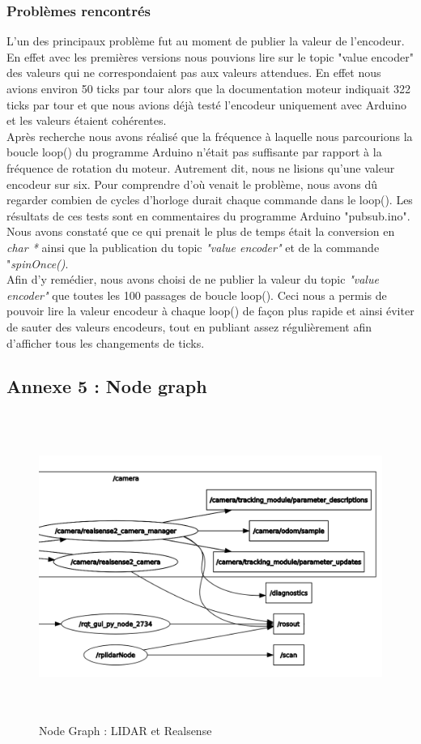 \documentclass[french]{rapportENSTAB}
\begin{document}
\subsubsection{Problèmes rencontrés}

L'un des principaux problème fut au moment de publier la valeur de l'encodeur. En effet avec les premières versions nous pouvions lire sur le topic "value encoder" des valeurs qui ne correspondaient pas aux valeurs attendues. En effet nous avions environ 50 ticks par tour alors que la documentation moteur indiquait 322 ticks par tour et que nous avions déjà testé l'encodeur uniquement avec Arduino et les valeurs étaient cohérentes.\\ 

Après recherche nous avons réalisé que la fréquence à laquelle nous parcourions la boucle loop() du programme Arduino n'était pas suffisante par rapport à la fréquence de rotation du moteur. Autrement dit, nous ne lisions qu'une valeur encodeur sur six. Pour comprendre d'où venait le problème, nous avons dû regarder combien de cycles d'horloge durait chaque commande dans le loop(). Les résultats de ces tests sont en commentaires du programme Arduino "pubsub.ino". Nous avons constaté que ce qui prenait le plus de temps était la conversion en \textit{char *} ainsi que la publication du topic \textit{"value encoder"} et de la commande "\textit{spinOnce()}.\\

Afin d'y remédier, nous avons choisi de ne publier la valeur du topic \textit{"value encoder"} que toutes les 100 passages de boucle loop(). Ceci nous a permis de pouvoir lire la valeur encodeur à chaque loop() de façon plus rapide et ainsi éviter de sauter des valeurs encodeurs, tout en publiant assez régulièrement afin d'afficher tous les changements de ticks.

\subsection{Annexe 5 : Node graph } \label{annexe5}


\begin{figure}[H]
    \centering
    \includegraphics[width = 15cm,height = 10cm]{images/robot/node_graph.png}
    \caption{Node Graph : LIDAR et Realsense}
    \label{fig:archi elec}
\end{figure}
\end{document}
